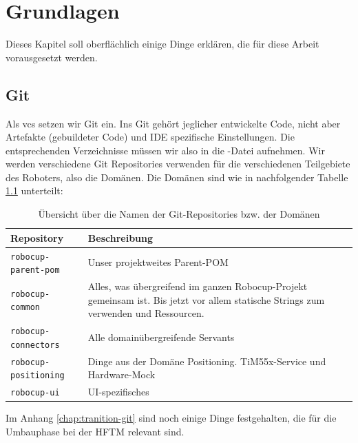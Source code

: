 \chapter{Grundlagen}
\label{chap:voraussetzungen}
Dieses Kapitel soll oberflächlich einige Dinge erklären, die für diese Arbeit vorausgesetzt werden.
\section{Git}
Als \Gls{vcs} setzen wir Git ein. Ins Git gehört jeglicher entwickelte Code, nicht aber Artefakte (gebuildeter Code) und IDE spezifische Einstellungen. Die entsprechenden Verzeichnisse müssen wir also in die -Datei aufnehmen. Wir werden verschiedene Git Repositories verwenden für die verschiedenen Teilgebiete des Roboters, also die Domänen. Die Domänen sind wie in nachfolgender Tabelle \ref{tab:gitRepositories} unterteilt:
\begin{table}[H]
	\centering
	\begin{tabular}{lp{13cm}} \toprule
		\textbf{Repository}          & \textbf{Beschreibung}\\ \midrule
		\texttt{robocup-parent-pom}  & Unser projektweites Parent-POM \\ \midrule
		\texttt{robocup-common}      & Alles, was übergreifend im ganzen Robocup-Projekt gemeinsam ist. Bis jetzt vor allem statische Strings zum verwenden und Ressourcen.\\ \midrule
		\texttt{robocup-connectors}  & Alle domainübergreifende Servants\\ \midrule
		\texttt{robocup-positioning} & Dinge aus der Domäne Positioning. TiM55x-Service und Hardware-Mock\\ \midrule
		\texttt{robocup-ui}          & UI-spezifisches\\ \bottomrule
	\end{tabular}
	\caption{Übersicht über die Namen der Git-Repositories bzw. der Domänen}
	\label{tab:gitRepositories}
\end{table}

Im Anhang \ref{chap:tranition-git} sind noch einige Dinge festgehalten, die für die Umbauphase bei der HFTM relevant sind.

